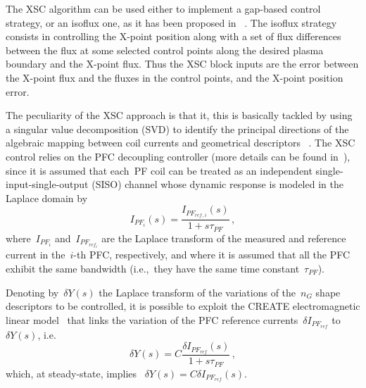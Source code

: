   The XSC algorithm can be used either to implement a gap-based control strategy, or an isoflux one, as it has been proposed in ~\cite{NCruz}. The isoflux strategy consists in controlling the X-point position along with a set of flux differences between the flux at some selected control points along the desired plasma boundary and the X-point flux. Thus the XSC block inputs are the error between the X-point flux and the fluxes in the control points, and the X-point position error.
\smallskip


The peculiarity of the XSC approach is that it, this  is basically tackled by using a singular value decomposition (SVD) to identify the principal directions of the algebraic mapping between coil currents and geometrical descriptors ~\cite{Albanese2005}. The XSC control relies on the PFC decoupling controller (more details can be found in~\cite[Section~4.4]{NCruz}), since it is assumed that each~PF coil can be treated as an independent single-input-single-output (SISO) channel whose dynamic response is modeled in the Laplace domain by
\[
I_{PF_i}(s) = \frac{I_{PF_{ref\,,i}}(s)}{1+s\tau_{PF}}\,,
\]
where~$I_{PF_i}$ and~$I_{PF_{ref_i}}$ are the Laplace transform of the measured and reference current in the~$i$-th PFC, respectively, and where it is assumed that all the PFC exhibit the same bandwidth (i.e.,~they have the same time constant~$\tau_{PF}$).
\smallskip

Denoting by~$\delta Y(s)$ the Laplace transform of the variations of the~$n_G$ shape descriptors  to be controlled, it is possible to exploit the CREATE electromagnetic linear model~\cite{NCruz} that links the variation of the PFC reference currents~$\delta I_{PF_{ref}}$ to ~$\delta Y(s)$, i.e.
\[
\delta Y(s) = C\frac{\delta I_{PF_{ref}}(s)}{1+s\tau_{PF}}\,,
\]
which, at steady-state, implies~ $\delta Y(s) = C \delta I_{PF_{ref}}(s)$.


